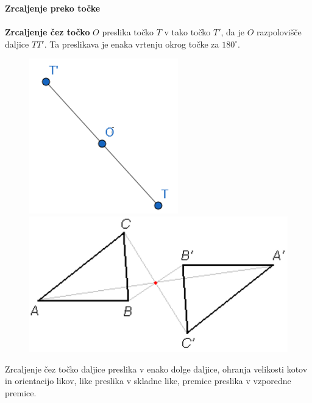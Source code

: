         
        \begin{frame}
            \large\textbf{Zrcaljenje preko točke}
            ~\\
            ~\\
            \normalsize
            \textbf{Zrcaljenje čez točko} $O$ preslika točko $T$ v tako točko $T'$, da je $O$ razpolovišče daljice $TT'$. Ta preslikava je enaka vrtenju okrog točke za $180^\circ$.

            \begin{figure}
                \includegraphics[scale=0.5]{Slike in skice/Zrcaljenje_tocke_cez_tocko.png}
                \includegraphics[scale=0.5]{Slike in skice/Zrcaljenje_lika_cez_tocko.png}
            \end{figure}

            Zrcaljenje čez točko daljice preslika v enako dolge daljice, ohranja velikosti kotov in orientacijo likov, like preslika v skladne like, premice preslika v vzporedne premice.

        \end{frame}


